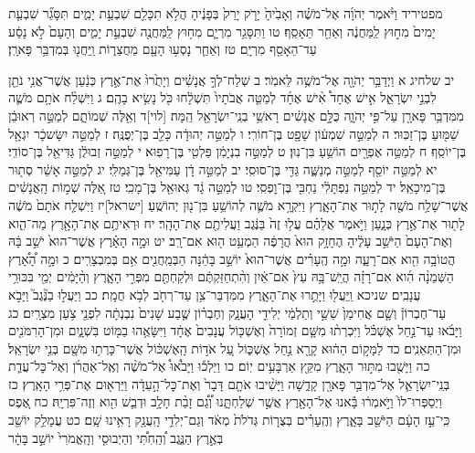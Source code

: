 \documentclass[twoside, openany, parskip=half, 11pt]{book}
\begin{document}
מפטיריד וַיֹּ֨אמֶר יְהֹוָ֜ה אֶל־מֹשֶׁ֗ה וְאָבִ֙יהָ֙ יָרֹ֤ק יָרַק֙ בְּפָנֶ֔יהָ הֲלֹ֥א תִכָּלֵ֖ם שִׁבְעַ֣ת יָמִ֑ים תִּסָּגֵ֞ר שִׁבְעַ֤ת יָמִים֙ מִח֣וּץ לַֽמַּחֲנֶ֔ה וְאַחַ֖ר תֵּאָסֵֽף׃ טו וַתִּסָּגֵ֥ר מִרְיָ֛ם מִח֥וּץ לַֽמַּחֲנֶ֖ה שִׁבְעַ֣ת יָמִ֑ים וְהָעָם֙ לֹ֣א נָסַ֔ע עַד־הֵאָסֵ֖ף מִרְיָֽם׃ טז וְאַחַ֛ר נָסְע֥וּ הָעָ֖ם מֵחֲצֵר֑וֹת וַֽיַּחֲנ֖וּ בְּמִדְבַּ֥ר פָּארָֽן׃

יב שלחיג א וַיְדַבֵּ֥ר יְהֹוָ֖ה אֶל־מֹשֶׁ֥ה לֵּאמֹֽר׃ ב שְׁלַח־לְךָ֣ אֲנָשִׁ֗ים וְיָתֻ֙רוּ֙ אֶת־אֶ֣רֶץ כְּנַ֔עַן אֲשֶׁר־אֲנִ֥י נֹתֵ֖ן לִבְנֵ֣י יִשְׂרָאֵ֑ל אִ֣ישׁ אֶחָד֩ אִ֨ישׁ אֶחָ֜ד לְמַטֵּ֤ה אֲבֹתָיו֙ תִּשְׁלָ֔חוּ כֹּ֖ל נָשִׂ֥יא בָהֶֽם׃ ג וַיִּשְׁלַ֨ח אֹתָ֥ם מֹשֶׁ֛ה מִמִּדְבַּ֥ר פָּארָ֖ן עַל־פִּ֣י יְהֹוָ֑ה כֻּלָּ֣ם אֲנָשִׁ֔ים רָאשֵׁ֥י בְנֵֽי־יִשְׂרָאֵ֖ל הֵֽמָּה׃ [לוי]ד וְאֵ֖לֶּה שְׁמוֹתָ֑ם לְמַטֵּ֣ה רְאוּבֵ֔ן שַׁמּ֖וּעַ בֶּן־זַכּֽוּר׃ ה לְמַטֵּ֣ה שִׁמְע֔וֹן שָׁפָ֖ט בֶּן־חוֹרִֽי׃ ו לְמַטֵּ֣ה יְהוּדָ֔ה כָּלֵ֖ב בֶּן־יְפֻנֶּֽה׃ ז לְמַטֵּ֣ה יִשָּׂשכָ֔ר יִגְאָ֖ל בֶּן־יוֹסֵֽף׃ ח לְמַטֵּ֥ה אֶפְרָ֖יִם הוֹשֵׁ֥עַ בִּן־נֽוּן׃ ט לְמַטֵּ֣ה בִנְיָמִ֔ן פַּלְטִ֖י בֶּן־רָפֽוּא׃ י לְמַטֵּ֣ה זְבוּלֻ֔ן גַּדִּיאֵ֖ל בֶּן־סוֹדִֽי׃ יא לְמַטֵּ֥ה יוֹסֵ֖ף לְמַטֵּ֣ה מְנַשֶּׁ֑ה גַּדִּ֖י בֶּן־סוּסִֽי׃ יב לְמַטֵּ֣ה דָ֔ן עַמִּיאֵ֖ל בֶּן־גְּמַלִּֽי׃ יג לְמַטֵּ֣ה אָשֵׁ֔ר סְת֖וּר בֶּן־מִיכָאֵֽל׃ יד לְמַטֵּ֣ה נַפְתָּלִ֔י נַחְבִּ֖י בֶּן־וׇפְסִֽי׃ טו לְמַטֵּ֣ה גָ֔ד גְּאוּאֵ֖ל בֶּן־מָכִֽי׃ טז אֵ֚לֶּה שְׁמ֣וֹת הָֽאֲנָשִׁ֔ים אֲשֶׁר־שָׁלַ֥ח מֹשֶׁ֖ה לָת֣וּר אֶת־הָאָ֑רֶץ וַיִּקְרָ֥א מֹשֶׁ֛ה לְהוֹשֵׁ֥עַ בִּן־נ֖וּן יְהוֹשֻֽׁעַ׃ [ישראל]יז וַיִּשְׁלַ֤ח אֹתָם֙ מֹשֶׁ֔ה לָת֖וּר אֶת־אֶ֣רֶץ כְּנָ֑עַן וַיֹּ֣אמֶר אֲלֵהֶ֗ם עֲל֥וּ זֶה֙ בַּנֶּ֔גֶב וַעֲלִיתֶ֖ם אֶת־הָהָֽר׃ יח וּרְאִיתֶ֥ם אֶת־הָאָ֖רֶץ מַה־הִ֑וא וְאֶת־הָעָם֙ הַיֹּשֵׁ֣ב עָלֶ֔יהָ הֶחָזָ֥ק הוּא֙ הֲרָפֶ֔ה הַמְעַ֥ט ה֖וּא אִם־רָֽב׃ יט וּמָ֣ה הָאָ֗רֶץ אֲשֶׁר־הוּא֙ יֹשֵׁ֣ב בָּ֔הּ הֲטוֹבָ֥ה הִ֖וא אִם־רָעָ֑ה וּמָ֣ה הֶֽעָרִ֗ים אֲשֶׁר־הוּא֙ יוֹשֵׁ֣ב בָּהֵ֔נָּה הַבְּמַֽחֲנִ֖ים אִ֥ם בְּמִבְצָרִֽים׃ כ וּמָ֣ה הָ֠אָ֠רֶץ הַשְּׁמֵנָ֨ה הִ֜וא אִם־רָזָ֗ה הֲיֵֽשׁ־בָּ֥הּ עֵץ֙ אִם־אַ֔יִן וְהִ֨תְחַזַּקְתֶּ֔ם וּלְקַחְתֶּ֖ם מִפְּרִ֣י הָאָ֑רֶץ וְהַ֨יָּמִ֔ים יְמֵ֖י בִּכּוּרֵ֥י עֲנָבִֽים׃ שניכא וַֽיַּעֲל֖וּ וַיָּתֻ֣רוּ אֶת־הָאָ֑רֶץ מִמִּדְבַּר־צִ֥ן עַד־רְחֹ֖ב לְבֹ֥א חֲמָֽת׃ כב וַיַּעֲל֣וּ בַנֶּ֘גֶב֮ וַיָּבֹ֣א עַד־חֶבְרוֹן֒ וְשָׁ֤ם אֲחִימַן֙ שֵׁשַׁ֣י וְתַלְמַ֔י יְלִידֵ֖י הָעֲנָ֑ק וְחֶבְר֗וֹן שֶׁ֤בַע שָׁנִים֙ נִבְנְתָ֔ה לִפְנֵ֖י צֹ֥עַן מִצְרָֽיִם׃ כג וַיָּבֹ֜אוּ עַד־נַ֣חַל אֶשְׁכֹּ֗ל וַיִּכְרְת֨וּ מִשָּׁ֤ם זְמוֹרָה֙ וְאֶשְׁכּ֤וֹל עֲנָבִים֙ אֶחָ֔ד וַיִּשָּׂאֻ֥הוּ בַמּ֖וֹט בִּשְׁנָ֑יִם וּמִן־הָרִמֹּנִ֖ים וּמִן־הַתְּאֵנִֽים׃ כד לַמָּק֣וֹם הַה֔וּא קָרָ֖א נַ֣חַל אֶשְׁכּ֑וֹל עַ֚ל אֹד֣וֹת הָֽאֶשְׁכּ֔וֹל אֲשֶׁר־כָּרְת֥וּ מִשָּׁ֖ם בְּנֵ֥י יִשְׂרָאֵֽל׃ כה וַיָּשֻׁ֖בוּ מִתּ֣וּר הָאָ֑רֶץ מִקֵּ֖ץ אַרְבָּעִ֥ים יֽוֹם׃ כו וַיֵּלְכ֡וּ וַיָּבֹ֩אוּ֩ אֶל־מֹשֶׁ֨ה וְאֶֽל־אַהֲרֹ֜ן וְאֶל־כׇּל־עֲדַ֧ת בְּנֵֽי־יִשְׂרָאֵ֛ל אֶל־מִדְבַּ֥ר פָּארָ֖ן קָדֵ֑שָׁה וַיָּשִׁ֨יבוּ אֹתָ֤ם דָּבָר֙ וְאֶת־כׇּל־הָ֣עֵדָ֔ה וַיַּרְא֖וּם אֶת־פְּרִ֥י הָאָֽרֶץ׃ כז וַיְסַפְּרוּ־לוֹ֙ וַיֹּ֣אמְר֔וּ בָּ֕אנוּ אֶל־הָאָ֖רֶץ אֲשֶׁ֣ר שְׁלַחְתָּ֑נוּ וְ֠גַ֠ם זָבַ֨ת חָלָ֥ב וּדְבַ֛שׁ הִ֖וא וְזֶה־פִּרְיָֽהּ׃ כח אֶ֚פֶס כִּֽי־עַ֣ז הָעָ֔ם הַיֹּשֵׁ֖ב בָּאָ֑רֶץ וְהֶֽעָרִ֗ים בְּצֻר֤וֹת גְּדֹלֹת֙ מְאֹ֔ד וְגַם־יְלִדֵ֥י הָֽעֲנָ֖ק רָאִ֥ינוּ שָֽׁם׃ כט עֲמָלֵ֥ק יוֹשֵׁ֖ב בְּאֶ֣רֶץ הַנֶּ֑גֶב וְ֠הַֽחִתִּ֠י וְהַיְבוּסִ֤י וְהָֽאֱמֹרִי֙ יוֹשֵׁ֣ב בָּהָ֔ר 
\end{document}
